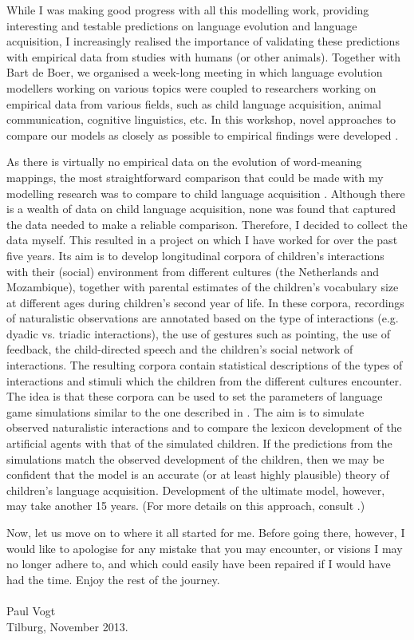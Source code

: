 While I was making good progress with all this modelling work, providing interesting and testable predictions on language evolution and language acquisition, I increasingly realised the importance of validating these predictions with empirical data from studies with humans (or other animals). Together with Bart de Boer, we organised a week-long meeting in which language evolution modellers working on various topics were coupled to researchers working on empirical data from various fields, such as child language acquisition, animal communication, cognitive linguistics, etc. In this workshop, novel approaches to compare our models as closely as possible to empirical findings were developed \citep{vogtdeboer:2010}.

As there is virtually no empirical data on the evolution of word-meaning mappings, the most straightforward comparison that could be made with my modelling research was to compare to child language acquisition \citep{vogtlieven:2010}. Although there is a wealth of data on child language acquisition, none was found that captured the data needed to make a reliable comparison. Therefore, I decided to collect the data myself. This resulted in a project on which I have worked for over the past five years. Its aim is to develop longitudinal corpora of children's interactions with their (social) environment from different cultures (the Netherlands and Mozambique), together with parental estimates of the children's vocabulary size at different ages during children's second year of life. In these corpora, recordings of naturalistic observations are annotated based on the type of interactions (e.g. dyadic vs. triadic interactions), the use of gestures such as pointing, the use of feedback, the child-directed speech and the children's social network of interactions. The resulting corpora  contain statistical descriptions of the types of interactions and stimuli which the children from the different cultures encounter. The idea is that these corpora can be used to set the parameters of language game simulations similar to the one described in \citet{vogthaasdijk:2010}. The aim is to simulate observed naturalistic interactions and to compare the lexicon development of the artificial agents with that of the simulated children. If the predictions from the simulations match the observed development of the children, then we may be confident that the model is an accurate (or at least highly plausible) theory of children's language acquisition. Development of the ultimate model, however, may take another 15 years. (For more details on this approach, consult \citealt{vogtmastin:2013}.)

 
Now, let us move on to where it all started for me. Before going there, however, I would like to apologise for any mistake that you may encounter, or visions I may no longer adhere to, and which could easily have been repaired if I would have had the time. Enjoy the rest of the journey.\\
\\
\noindent Paul Vogt\\
\noindent Tilburg, November 2013.
